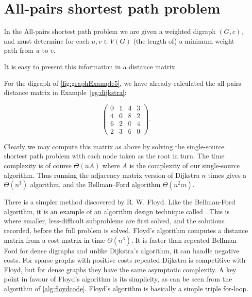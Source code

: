 


\chapter{All-pairs shortest path problem} %
\label{sec:APSP}

In the All-pairs shortest path problem we are given a weighted digraph $(G, c)$, and must determine 
for each $u, v\in V(G)$ (the length of) a minimum weight path from $u$
to $v$.

It is easy to present this information in a distance matrix.

\begin{Example}
\label{eg:APSP}
For the digraph of \cref{fig:graphExample5}, we have already
calculated the all-pairs distance matrix in Example~\ref{eg:dijkstra}:

$$
\left(
\begin{matrix}
0 & 1 & 4 & 3 \\
4 & 0 & 8 & 2 \\
6 & 2 & 0 & 4 \\
2 & 3 & 6 & 0
\end{matrix}
\right).
$$
\end{Example}

Clearly we may compute this matrix as above by solving the single-source
shortest path problem with each node taken as the root in turn. The time
complexity is of course $\Theta(nA)$ where $A$ is the complexity of our
single-source algorithm. Thus running the adjacency matrix version of
Dijkstra $n$ times gives a $\Theta(n^3)$ algorithm, and the 
Bellman--Ford algorithm $\Theta(n^2 m)$.

There is a simpler method discovered by R. W. Floyd. Like the Bellman-Ford 
algorithm, it is an example of an algorithm design technique called 
.
This is where smaller, less-difficult subproblems are first solved, and the 
solutions recorded, before
the full problem is solved. Floyd's algorithm computes a distance matrix
from a cost matrix in time $\Theta(n^3)$. It is faster than repeated
Bellman--Ford for dense digraphs and unlike Dijkstra's algorithm,
it can handle negative costs. For sparse graphs with positive costs
repeated Dijkstra is competitive with Floyd, but for dense graphs they
have the same asymptotic complexity. A key point in favour of Floyd's
algorithm is its simplicity, as can be seen from the algorithm of
\cref{alg:floydcode}. Floyd's algorithm is basically a simple
triple for-loop.

